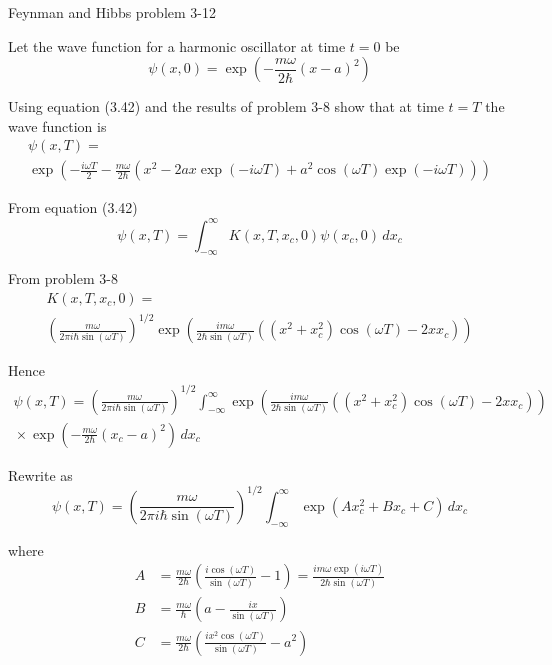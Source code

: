 \documentclass[12pt]{article}
\begin{document}
Feynman and Hibbs problem 3-12

\bigskip
Let the wave function for a harmonic oscillator at time $t=0$ be
\begin{equation*}
\psi(x,0)=\exp\left(-\frac{m\omega}{2\hbar}(x-a)^2\right)
\end{equation*}

Using equation (3.42) and the results of problem 3-8 show that
at time $t=T$ the wave function is
\begin{multline*}
\psi(x,T)=
\\
\exp\left(
-\frac{i\omega T}{2}-\frac{m\omega}{2\hbar}
\left(x^2-2ax\exp(-i\omega T)+a^2\cos(\omega T)\exp(-i\omega T)\right)
\right)
\end{multline*}

From equation (3.42)
\begin{equation*}
\psi(x,T)=\int_{-\infty}^\infty K(x,T,x_c,0)\psi(x_c,0)\,dx_c
\end{equation*}

From problem 3-8
\begin{multline*}
K(x,T,x_c,0)=
\\
\left(\frac{m\omega}{2\pi i\hbar\sin(\omega T)}\right)^{1/2}
\exp\left(
\frac{im\omega}{2\hbar\sin(\omega T)}\left((x^2+x_c^2)\cos(\omega T)-2xx_c\right)
\right)
\end{multline*}

Hence
\begin{multline*}
\psi(x,T)=\left(\frac{m\omega}{2\pi i\hbar\sin(\omega T)}\right)^{1/2}
\int_{-\infty}^\infty \exp\left(
\frac{im\omega}{2\hbar\sin(\omega T)}\left((x^2+x_c^2)\cos(\omega T)-2xx_c\right)
\right)
\\
{}\times\exp\left(-\frac{m\omega}{2\hbar}(x_c-a)^2\right)\,dx_c
\end{multline*}

Rewrite as
\begin{equation*}
\psi(x,T)=\left(\frac{m\omega}{2\pi i\hbar\sin(\omega T)}\right)^{1/2}
\int_{-\infty}^\infty\exp(Ax_c^2+Bx_c+C)\,dx_c
\tag{1}
\end{equation*}

where
\begin{align*}
A&=\frac{m\omega}{2\hbar}\left(\frac{i\cos(\omega T)}{\sin(\omega T)}-1\right)
=\frac{im\omega\exp(i\omega T)}{2\hbar\sin(\omega T)}
\\
B&=\frac{m\omega}{\hbar}\left(a-\frac{ix}{\sin(\omega T)}\right)
\\
C&=\frac{m\omega}{2\hbar}\left(\frac{ix^2\cos(\omega T)}{\sin(\omega T)}-a^2\right)
\end{align*}
\end{document}
